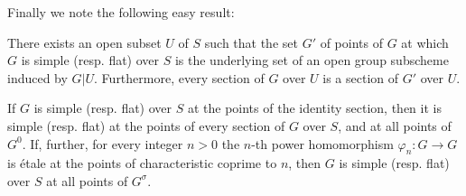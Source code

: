 Finally we note the following easy result:


\begin{proposition}\label{fga3.vi-1-proposition-1.11}
    There exists an open subset $U$ of $S$ such that the set $G'$ of points of $G$ at which $G$ is simple (resp. flat) over $S$ is the underlying set of an open group subscheme induced by $G|U$.
    Furthermore, every section of $G$ over $U$ is a section of $G'$ over $U$.
\end{proposition}

\begin{corollary}\label{fga3.vi-1-corollary-1.12}
    If $G$ is simple (resp. flat) over $S$ at the points of the identity section, then it is simple (resp. flat) at the points of every section of $G$ over $S$, and at all points of $G^0$.
    If, further, for every integer $n>0$ the $n$-th power homomorphism $\varphi_n\colon G\to G$ is étale at the points of characteristic coprime to $n$, then $G$ is simple (resp. flat) over $S$ at all points of $G^\sigma$.
\end{corollary}